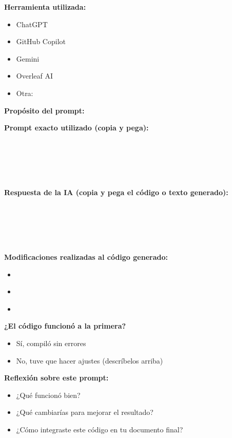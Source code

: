 \textbf{Herramienta utilizada:} 
\begin{itemize}
    \item[ ] ChatGPT
    \item[ ] GitHub Copilot
    \item[ ] Gemini
    \item[ ] Overleaf AI
    \item[ ] Otra: \underline{\hspace{4cm}}
\end{itemize}

\textbf{Propósito del prompt:} 
\vspace{0.2cm}
\underline{\hspace{12cm}}
\vspace{0.2cm}
\underline{\hspace{12cm}}

\textbf{Prompt exacto utilizado (copia y pega):}
\begin{verbatim}





\end{verbatim}

\textbf{Respuesta de la IA (copia y pega el código o texto generado):}
\begin{verbatim}





\end{verbatim}

\textbf{Modificaciones realizadas al código generado:}
\begin{itemize}
    \item \underline{\hspace{10cm}}
    \item \underline{\hspace{10cm}}
    \item \underline{\hspace{10cm}}
\end{itemize}

\textbf{¿El código funcionó a la primera?}
\begin{itemize}
    \item[ ] Sí, compiló sin errores
    \item[ ] No, tuve que hacer ajustes (descríbelos arriba)
\end{itemize}

\textbf{Reflexión sobre este prompt:}
\begin{itemize}
    \item ¿Qué funcionó bien?
    \underline{\hspace{10cm}}
    
    \item ¿Qué cambiarías para mejorar el resultado?
    \underline{\hspace{10cm}}
    
    \item ¿Cómo integraste este código en tu documento final?
    \underline{\hspace{10cm}}
\end{itemize}

